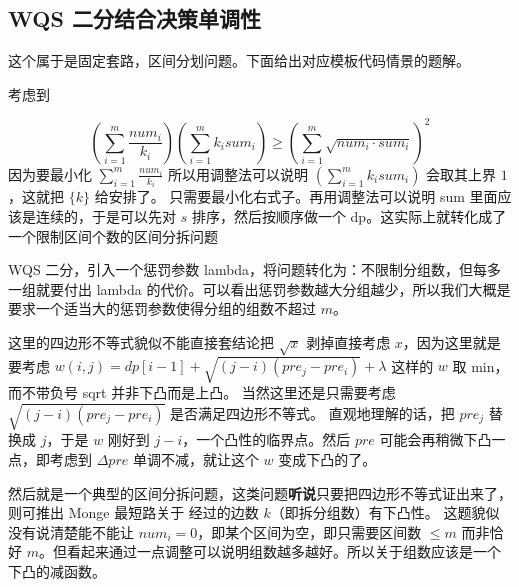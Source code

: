 \subsection{WQS 二分结合决策单调性}

这个属于是固定套路，区间分划问题。下面给出对应模板代码情景的题解。

考虑到

$$
(\sum\limits_{i=1}^{m}\frac{num_i}{k_i}) (\sum\limits_{i=1}^{m}k_i sum_i) \ge (\sum_{i=1}^{m}\sqrt{num_i\cdot sum_i})^2
$$
因为要最小化 $\sum\limits_{i=1}^{m}\frac{num_i}{k_i}$ 所以用调整法可以说明 $(\sum\limits_{i=1}^{m}k_i sum_i)$ 会取其上界 $1$，这就把 $\{k\}$ 给安排了。
只需要最小化右式子。再用调整法可以说明 sum 里面应该是连续的，于是可以先对 $s$ 排序，然后按顺序做一个 dp。这实际上就转化成了一个限制区间个数的区间分拆问题

WQS 二分，引入一个惩罚参数 lambda，将问题转化为：不限制分组数，但每多一组就要付出 lambda 的代价。可以看出惩罚参数越大分组越少，所以我们大概是要求一个适当大的惩罚参数使得分组的组数不超过 $m$。

这里的四边形不等式貌似不能直接套结论把 $\sqrt{x}$ 剥掉直接考虑 $x$，因为这里就是要考虑 $w(i,j) = dp[i-1] + \sqrt{(j-i)(pre_{j} - pre_{i})} + \lambda$ 这样的 $w$ 取 min，而不带负号 sqrt 并非下凸而是上凸。
当然这里还是只需要考虑 $\sqrt{(j-i)(pre_{j} - pre_{i})}$ 是否满足四边形不等式。
直观地理解的话，把 $pre_j$ 替换成 $j$，于是 $w$ 刚好到 $j-i$，一个凸性的临界点。然后 $pre$ 可能会再稍微下凸一点，即考虑到 $\Delta pre$ 单调不减，就让这个 $w$ 变成下凸的了。

然后就是一个典型的区间分拆问题，这类问题\textbf{听说}只要把四边形不等式证出来了，则可推出 Monge 最短路关于 经过的边数 $k$（即拆分组数）有下凸性。
这题貌似没有说清楚能不能让 $num_i=0$，即某个区间为空，即只需要区间数 $\le m$ 而非恰好 $m$。但看起来通过一点调整可以说明组数越多越好。所以关于组数应该是一个下凸的减函数。


